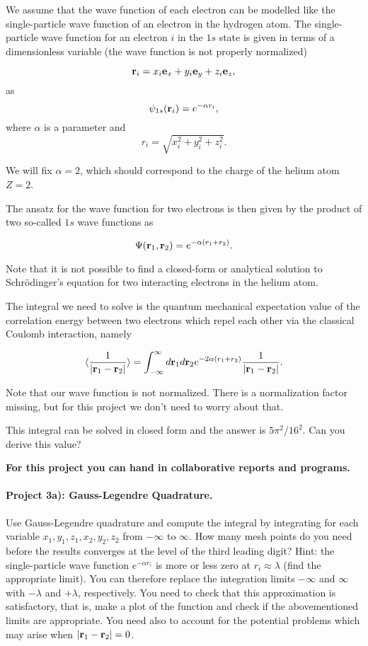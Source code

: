 \documentclass[%
oneside,                 %
final,                   %
10pt]{article}
\begin{document}
We assume that the wave function of each electron can be modelled like
the single-particle wave function of an electron in the hydrogen
atom. The single-particle wave function for an electron $i$ in the
$1s$ state is given in terms of a dimensionless variable (the wave
function is not properly normalized)

\[
   {\bf r}_i =  x_i {\bf e}_x + y_i {\bf e}_y +z_i {\bf e}_z ,
\]
as
\[
   \psi_{1s}({\bf r}_i)  =   e^{-\alpha r_i},
\]
where $\alpha$ is a parameter and 
\[
r_i = \sqrt{x_i^2+y_i^2+z_i^2}.
\]

We will fix $\alpha=2$, which should correspond to the charge of the helium atom $Z=2$. 

The ansatz for the wave function for two electrons is then given by the product of two 
so-called 
$1s$ wave functions as 

\[
   \Psi({\bf r}_1,{\bf r}_2)  =   e^{-\alpha (r_1+r_2)}.
\]

Note that it is not possible to find a closed-form or analytical
solution to Schr\"odinger's equation for two interacting electrons in
the helium atom.

The integral we need to solve is the quantum mechanical expectation
value of the correlation energy between two electrons which repel each
other via the classical Coulomb interaction, namely

\begin{equation}\label{eq:correlationenergy}
   \langle \frac{1}{|{\bf r}_1-{\bf r}_2|} \rangle =
   \int_{-\infty}^{\infty} d{\bf r}_1d{\bf r}_2  e^{-2\alpha (r_1+r_2)}\frac{1}{|{\bf r}_1-{\bf r}_2|}.
\end{equation}

Note that our wave function is not normalized. There is a
normalization factor missing, but for this project we don't need to
worry about that.

This integral can be solved in closed form and the answer is
$5\pi^2/16^2$. Can you derive this value?

\textbf{For this project you can hand in collaborative reports and programs.}

\paragraph{Project  3a): Gauss-Legendre Quadrature.}
Use Gauss-Legendre quadrature and compute the integral by integrating
for each variable $x_1,y_1,z_1,x_2,y_2,z_2$ from $-\infty$ to
$\infty$.  How many mesh points do you need before the results
converges at the level of the third leading digit?  Hint: the
single-particle wave function $e^{-\alpha r_i}$ is more or less zero
at $r_i \approx \lambda$ (find the appropriate limit).  You can therefore
replace the integration limits $-\infty$ and $\infty$ with $-\lambda$ and
$+\lambda$, respectively.  You need to check that this approximation is
satisfactory, that is, make a plot of the function and check if the
abovementioned limits are appropriate.  You need also to account for
the potential problems which may arise when $|{\bf r}_1-{\bf r}_2|=0$.
\end{document}
